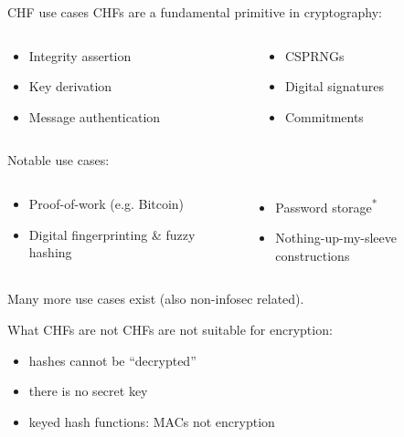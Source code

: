 \begin{frame}{CHF use cases}
  CHFs are a fundamental primitive in cryptography:
  \begin{columns}
    \begin{column}{0.4\textwidth}
      \begin{itemize}[<+(1)->]
        \item Integrity assertion
        \item Key derivation
        \item Message authentication
      \end{itemize}
    \end{column}
    \begin{column}{0.4\textwidth}
      \begin{itemize}[<+(1)->]
        \item CSPRNGs
        \item Digital signatures
        \item Commitments
      \end{itemize}
    \end{column}
  \end{columns}

  \vspace*{1.5em}
  \pause
  Notable use cases:
  \begin{columns}
    \begin{column}{0.4\textwidth}
      \begin{itemize}[<+(1)->]
        \item Proof-of-work (e.g. Bitcoin)
        \item Digital fingerprinting \& fuzzy hashing
      \end{itemize}
    \end{column}
    \begin{column}{0.4\textwidth}
      \begin{itemize}[<+(1)->]
        \item Password storage\textsuperscript{*}
        \item Nothing-up-my-sleeve constructions
      \end{itemize}
    \end{column}
  \end{columns}

  \vspace*{1.5em}
  \pause
  Many more use cases exist (also non-infosec related).
\end{frame}

\begin{frame}{What CHFs are not}
  CHFs are not suitable for encryption:
  \begin{itemize}[<+(1)->]
    \item hashes cannot be \enquote{decrypted}
    \item there is no secret key
    \item keyed hash functions: MACs not encryption
  \end{itemize}
\end{frame}

